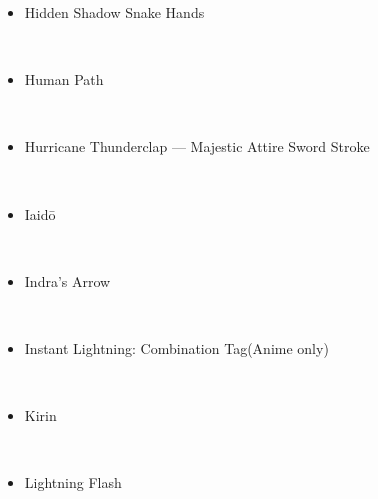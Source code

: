 \documentclass[a4paper,12pt]{article}
\begin{document}
\begin{itemize}
\item Hidden Shadow Snake Hands
\end{itemize}\\ \par \vspace{0.5cm}

\begin{itemize}
\item Human Path
\end{itemize}\\ \par \vspace{0.5cm}

\begin{itemize}
\item Hurricane Thunderclap — Majestic Attire Sword Stroke
\end{itemize}\\ \par \vspace{0.5cm}

\begin{itemize}
\item Iaidō
\end{itemize}\\ \par \vspace{0.5cm}

\begin{itemize}
\item Indra's Arrow
\end{itemize}\\ \par \vspace{0.5cm}

\begin{itemize}
\item Instant Lightning: Combination Tag(Anime only)
\end{itemize}\\ \par \vspace{0.5cm}

\begin{itemize}
\item Kirin
\end{itemize}\\ \par \vspace{0.5cm}

\begin{itemize}
\item Lightning Flash
\end{itemize}\\ \par \vspace{0.5cm}
\end{document}
